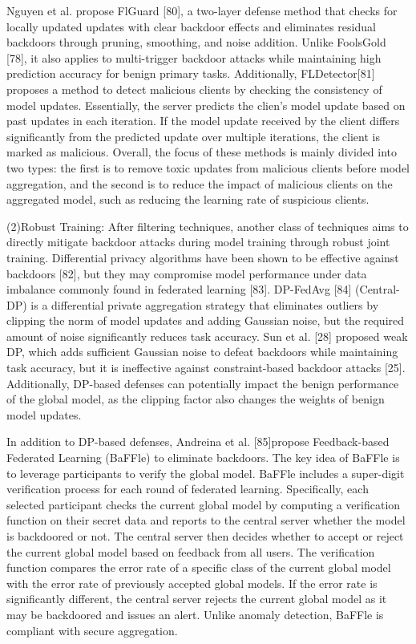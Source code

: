 Nguyen et al. propose FlGuard [80], a two-layer defense
method that checks for locally updated updates with
clear backdoor effects and eliminates residual backdoors
through pruning, smoothing, and noise addition. Unlike
FoolsGold [78], it also applies to multi-trigger backdoor
attacks while maintaining high prediction accuracy for
benign primary tasks. Additionally, FLDetector[81]
proposes a method to detect malicious clients by checking
the consistency of model updates. Essentially, the server
predicts the clien's model update based on past updates
in each iteration. If the model update received by the
client differs significantly from the predicted update over
multiple iterations, the client is marked as malicious.
Overall, the focus of these methods is mainly divided
into two types: the first is to remove toxic updates
from malicious clients before model aggregation, and the
second is to reduce the impact of malicious clients on the
aggregated model, such as reducing the learning rate of
suspicious clients.  

(2)Robust Training: After filtering techniques, another
class of techniques aims to directly mitigate backdoor
attacks during model training through robust joint training.
Differential privacy algorithms have been shown to be
effective against backdoors [82], but they may compromise
model performance under data imbalance commonly found
in federated learning [83]. DP-FedAvg [84] (Central-DP)
is a differential private aggregation strategy that
eliminates outliers by clipping the norm of model updates
and adding Gaussian noise, but the required amount of
noise significantly reduces task accuracy. Sun et al. [28]
proposed weak DP, which adds suﬀicient Gaussian noise to
defeat backdoors while maintaining task accuracy, but it is
ineffective against constraint-based backdoor attacks [25].
Additionally, DP-based defenses can potentially impact
the benign performance of the global model, as the
clipping factor also changes the weights of benign model
updates.  

In addition to DP-based defenses, Andreina et al.
[85]propose Feedback-based Federated Learning (BaFFle)
to eliminate backdoors. The key idea of BaFFle is to
leverage participants to verify the global model. BaFFle
includes a super-digit verification process for each round
of federated learning. Specifically, each selected
participant checks the current global model by computing a
verification function on their secret data and reports to
the central server whether the model is backdoored or
not. The central server then decides whether to accept or
reject the current global model based on feedback from all
users. The verification function compares the error rate of
a specific class of the current global model with the error
rate of previously accepted global models. If the error
rate is significantly different, the central server rejects the
current global model as it may be backdoored and issues
an alert. Unlike anomaly detection, BaFFle is compliant
with secure aggregation.  

